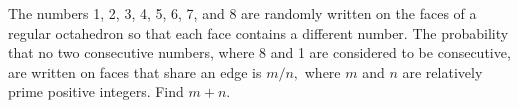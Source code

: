 The numbers 1, 2, 3, 4, 5, 6, 7, and 8 are randomly written on the faces of a regular octahedron so that each face contains a different number.  The probability that no two consecutive numbers, where 8 and 1 are considered to be consecutive, are written on faces that share an edge is $m/n,$ where $m$ and $n$ are relatively prime positive integers.  Find $m+n.$